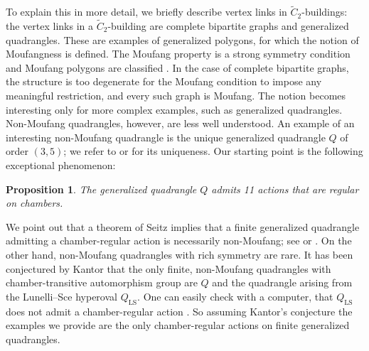 \documentclass[dvipsnames]{article}
\newtheorem{proposition}[theorem]{Proposition}
\theoremstyle{definition}
\theoremstyle{remark}
\DeclareMathOperator{\LS}{LS}
\begin{document}
    To explain this in more detail, we briefly describe vertex links in $\tilde C_2$-buildings:
    the vertex links in a $\tilde C_2$-building are complete bipartite graphs and generalized quadrangles.
    These are examples of generalized polygons, for which the notion of Moufangness is defined. The Moufang property is a strong symmetry condition and Moufang polygons are classified \cite{TitsWeiss_polygons}. In the case of complete bipartite graphs, the structure is too degenerate for the Moufang condition to impose any meaningful restriction, and every such graph is Moufang. The notion becomes interesting only for more complex examples, such as generalized quadrangles. Non-Moufang quadrangles, however, are less well understood.
    An example of an interesting non-Moufang quadrangle is the unique generalized quadrangle $Q$ of order $(3,5)$; we refer to \cite{DixmierZara} or \cite[6.2.4]{PayneThas} for its uniqueness. Our starting point is the following exceptional phenomenon:
    \begin{proposition}\label{prop:intro_regular_action_on_Q}
        The generalized quadrangle $Q$ admits 11 actions that are regular on chambers.
    \end{proposition}
    We point out that a theorem of Seitz implies that a finite generalized quadrangle admitting a chamber-regular action is necessarily non-Moufang; see \cite{Seitz} or \cite[Theorem 4.8.7]{VanMaldeghem}.
    On the other hand, non-Moufang quadrangles with rich symmetry are rare. It has been conjectured by Kantor \cite{Kantor} that the only finite, non-Moufang quadrangles with chamber-transitive automorphism group are $Q$ and the quadrangle arising from the Lunelli--Sce hyperoval $Q_{\LS}$.
    One can easily check with a computer, that $Q_{\LS}$ does not admit a chamber-regular action \cite{ChamberRegularCode}. So assuming Kantor's conjecture the examples we provide are the only chamber-regular actions on finite generalized quadrangles.
\end{document}
